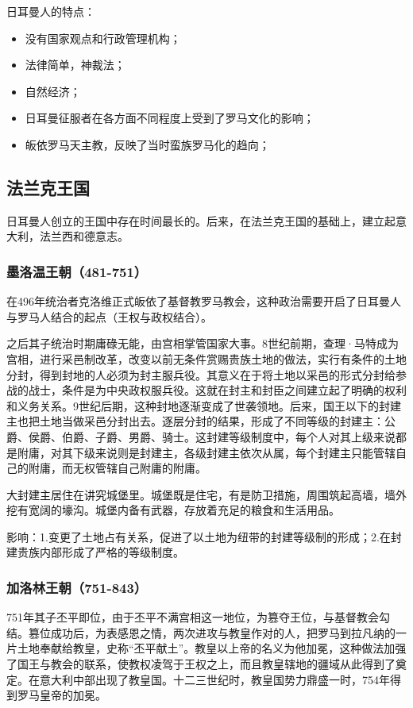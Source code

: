 日耳曼人的特点：

\begin{itemize}
    \item 没有国家观点和行政管理机构；
    \item 法律简单，神裁法；
    \item 自然经济；
    \item 日耳曼征服者在各方面不同程度上受到了罗马文化的影响；
    \item 皈依罗马天主教，反映了当时蛮族罗马化的趋向；
\end{itemize}

\subsection{法兰克王国}
日耳曼人创立的王国中存在时间最长的。后来，在法兰克王国的基础上，建立起意大利，法兰西和德意志。

\subsubsection{墨洛温王朝（481-751）}
在496年统治者克洛维正式皈依了基督教罗马教会，这种政治需要开启了日耳曼人与罗马人结合的起点（王权与政权结合）。

之后其子统治时期庸碌无能，由宫相掌管国家大事。8世纪前期，查理·马特成为宫相，进行采邑制改革，改变以前无条件赏赐贵族土地的做法，实行有条件的土地分封，得到封地的人必须为封主服兵役。其意义在于将土地以采邑的形式分封给参战的战士，条件是为中央政权服兵役。这就在封主和封臣之间建立起了明确的权利和义务关系。9世纪后期，这种封地逐渐变成了世袭领地。后来，国王以下的封建主也把土地当做采邑分封出去。逐层分封的结果，形成了不同等级的封建主：公爵、侯爵、伯爵、子爵、男爵、骑士。这封建等级制度中，每个人对其上级来说都是附庸，对其下级来说则是封建主，各级封建主依次从属，每个封建主只能管辖自己的附庸，而无权管辖自己附庸的附庸。

大封建主居住在讲究城堡里。城堡既是住宅，有是防卫措施，周围筑起高墙，墙外挖有宽阔的壕沟。城堡内备有武器，存放着充足的粮食和生活用品。

影响：1.变更了土地占有关系，促进了以土地为纽带的封建等级制的形成；2.在封建贵族内部形成了严格的等级制度。

\subsubsection{加洛林王朝（751-843）}
751年其子丕平即位，由于丕平不满宫相这一地位，为篡夺王位，与基督教会勾结。篡位成功后，为表感恩之情，两次进攻与教皇作对的人，把罗马到拉凡纳的一片土地奉献给教皇，史称“丕平献土”。教皇以上帝的名义为他加冕，这种做法加强了国王与教会的联系，使教权凌驾于王权之上，而且教皇辖地的疆域从此得到了奠定。在意大利中部出现了教皇国。十二三世纪时，教皇国势力鼎盛一时，754年得到罗马皇帝的加冕。

